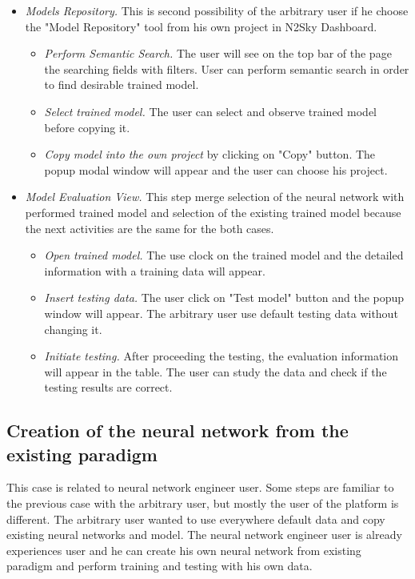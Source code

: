 \begin{itemize}
\item \emph{Models Repository.} This is second possibility of the arbitrary user if he choose the "Model Repository" tool from his own project in N2Sky Dashboard.
\begin{itemize}
\item \emph{Perform Semantic Search.} The user will see on the top bar of the page the searching fields with filters. User can perform semantic search in order to find desirable trained model.
\item \emph{Select trained model.} The user can select and observe trained model before copying it.
\item \emph{Copy model into the own project} by clicking on "Copy" button. The popup modal window will appear and the user can choose his project.
\end{itemize}

\item \emph{Model Evaluation View.} This step merge selection of the neural network with performed trained model and selection of the existing trained model because the next activities are the same for the both cases.
\begin{itemize}
\item \emph{Open trained model.} The use clock on the trained model and the detailed information with a training data will appear.
\item \emph{Insert testing data.} The user click on "Test model" button and the popup window will appear. The arbitrary user use default testing data without changing it.
\item \emph{Initiate testing.} After proceeding the testing, the evaluation information will appear in the table. The user can study the data and check if the testing results are correct.
\end{itemize}


\end{itemize}



\subsection{Creation of the neural network from the existing paradigm}\label{Creation of the neural network from the existing paradigm}

This case is related to neural network engineer user. Some steps are familiar to the previous case with the arbitrary user, but mostly the user of the platform is different. The arbitrary user wanted to use everywhere default data and copy existing neural networks and model. The neural network engineer user is already experiences user and he can create his own neural network from existing paradigm and perform training and testing with his own data.


